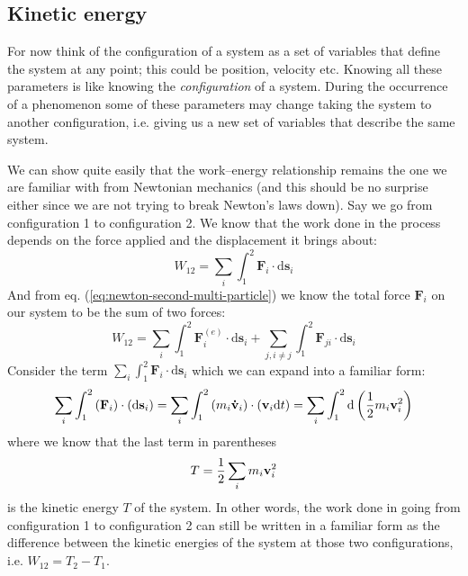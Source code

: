 \documentclass[english,seminar,headertitle]{lecture}
\begin{document}
\subsection{Kinetic energy}
%
For now think of the configuration of a system as a set of variables that define the system at any point; this could be position, velocity etc. Knowing all these parameters is like knowing the \textit{configuration} of a system. During the occurrence of a phenomenon some of these parameters may change taking the system to another configuration, i.e. giving us a new set of variables that describe the same system.

We can show quite easily that the work--energy relationship remains the one we are familiar with from Newtonian mechanics (and this should be no surprise either since we are not trying to break Newton's laws down). Say we go from configuration 1 to configuration 2. We know that the work done in the process depends on the force applied and the displacement it brings about:
$$
W_{12} = \sum_i \int_1^2\mathbf{F}_i \cdot \textrm{d}\mathbf{s}_i
$$
And from eq. (\ref{eq:newton-second-multi-particle}) we know the total force $\mathbf{F}_i$ on our system to be the sum of two forces:
\begin{equation}
W_{12} = \sum_i \int_1^2 \mathbf{F}_i^{(e)} \cdot \textrm{d}\mathbf{s}_i + \sum_{j,i\neq j} \int_1^2 \mathbf{F}_{ji} \cdot \textrm{d}\mathbf{s}_i \label{eq:W12}
\end{equation}
Consider the term $\sum_i \int_1^2\mathbf{F}_i \cdot \textrm{d}\mathbf{s}_i$ which we can expand into a familiar form:
$$
\sum_i \int_1^2 \left( \mathbf{F}_i \right) \cdot \left( \textrm{d}\mathbf{s}_i \right) = \sum_i \int_1^2 \left( m_i\mathbf{\dot{v}}_i \right) \cdot \left( \mathbf{v}_i \textrm{d}t \right) = \sum_i \int_1^2 \textrm{d}\left( {1\over 2} m_i \mathbf{v}_i^2 \right)
$$
where we know that the last term in parentheses
\begin{equation}
T = {1\over 2} \sum_i m_i \mathbf{v}_i^2 \label{eq:T-basic}
\end{equation}%
is the kinetic energy $T$ of the system. In other words, the work done in going from configuration 1 to configuration 2 can still be written in a familiar form as the difference between the kinetic energies of the system at those two configurations, i.e. $W_{12} = T_2 - T_1$.
\end{document}
